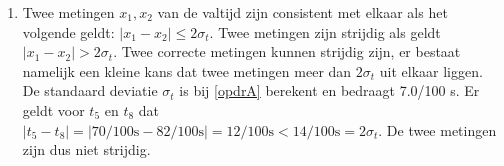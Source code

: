 \documentclass[12pt, dutch, a4paper]{article}
\theoremstyle{definition}
\begin{document}
\begin{enumerate}[(a.)]
\newpage
\item \label{opdrD} 
Twee metingen $x_1, x_2$ van de valtijd zijn consistent met elkaar als het volgende geldt: $\lvert x_1 - x_2 \rvert \leq 2\sigma_{t}$. Twee metingen zijn strijdig als geldt $\lvert x_1 - x_2 \rvert > 2\sigma_{t}$. Twee correcte metingen kunnen strijdig zijn, er bestaat namelijk een kleine kans dat twee metingen meer dan $2\sigma_{t}$ uit elkaar liggen. De standaard deviatie $\sigma_{t}$ is bij \ref{opdrA} berekent en bedraagt 7.0/100 s. Er geldt voor $t_5$ en $t_8$ dat $\lvert t_5 - t_8 \rvert = \lvert 70/100 \unit{\second} - 82/100 \unit{\second} \rvert = 12/100 \unit{\second} < 14/100 \unit{\second} = 2\sigma_{t}$. De twee metingen zijn dus niet strijdig. 



\end{enumerate}
\end{document}
